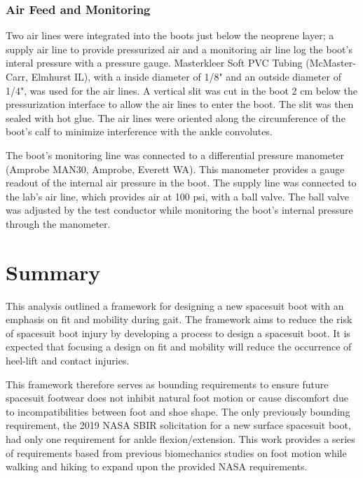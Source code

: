 \documentclass[defaultstyle,11pt]{thesis}
\begin{document}
\hypertarget{air-feed-and-monitoring}{%
\subsubsection{Air Feed and Monitoring}\label{air-feed-and-monitoring}}

Two air lines were integrated into the boots just below the neoprene layer; a supply air line to provide pressurized air and a monitoring air line log the boot's interal pressure with a pressure gauge.
Masterkleer Soft PVC Tubing (McMaster-Carr, Elmhurst IL), with a inside diameter of 1/8" and an outside diameter of 1/4", was used for the air lines.
A vertical slit was cut in the boot 2 cm below the pressurization interface to allow the air lines to enter the boot.
The slit was then sealed with hot glue.
The air lines were oriented along the circumference of the boot's calf to minimize interference with the ankle convolutes.

The boot's monitoring line was connected to a differential pressure manometer (Amprobe MAN30, Amprobe, Everett WA).
This manometer provides a gauge readout of the internal air pressure in the boot.
The supply line was connected to the lab's air line, which provides air at 100 psi, with a ball valve.
The ball valve was adjusted by the test conductor while monitoring the boot's internal pressure through the manometer.

\hypertarget{summary-5}{%
\section{Summary}\label{summary-5}}

This analysis outlined a framework for designing a new spacesuit boot with an emphasis on fit and mobility during gait.
The framework aims to reduce the risk of spacesuit boot injury by developing a process to design a spacesuit boot.
It is expected that focusing a design on fit and mobility will reduce the occurrence of heel-lift and contact injuries.

This framework therefore serves as bounding requirements to ensure future spacesuit footwear does not inhibit natural foot motion or cause discomfort due to incompatibilities between foot and shoe shape.
The only previously bounding requirement, the 2019 NASA SBIR solicitation for a new surface spacesuit boot, had only one requirement for ankle flexion/extension.
This work provides a series of requirements based from previous biomechanics studies on foot motion while walking and hiking to expand upon the provided NASA requirements.
\end{document}
